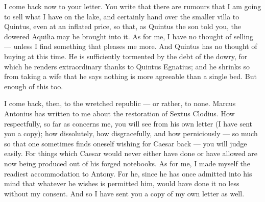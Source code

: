  I come back now to your letter. You write that there are rumours that I am going to sell what I have on the lake, and certainly hand over the smaller villa to Quintus, even at an inflated price, so that, as Quintus the son told you, the dowered Aquilia may be brought into it. As for me, I have no thought of selling --- unless I find something that pleases me more. And Quintus has no thought of buying at this time. He is sufficiently tormented by the debt of the dowry, for which he renders extraordinary thanks to Quintus Egnatius; and he shrinks so from taking a wife that he says nothing is more agreeable than a single bed. But enough of this too.

 I come back, then, to the wretched republic --- or rather, to none. Marcus Antonius has written to me about the restoration of Sextus Clodius. How respectfully, so far as concerns me, you will see from his own letter (I have sent you a copy); how dissolutely, how disgracefully, and how perniciously --- so much so that one sometimes finds oneself wishing for Caesar back --- you will judge easily. For things which Caesar would never either have done or have allowed are now being produced out of his forged notebooks. As for me, I made myself the readiest accommodation to Antony. For he, since he has once admitted into his mind that whatever he wishes is permitted him, would have done it no less without my consent. And so I have sent you a copy of my own letter as well.
